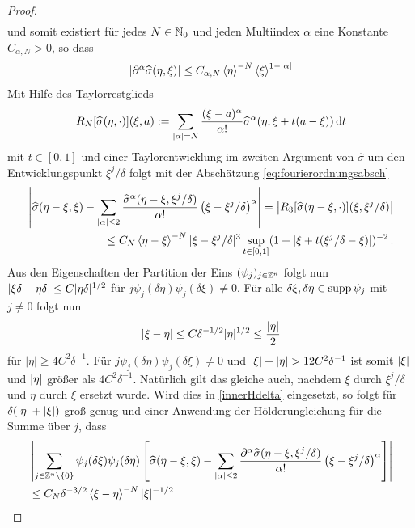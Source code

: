 \begin{proof}
\begin{align}
\end{align}
und somit existiert für jedes $N\in\mathbb N_0$ und jeden Multiindex $\alpha$ eine Konstante $C_{\alpha,N}> 0 $, so dass
\begin{align}\label{eq:fourierordnungsabsch}
\lvert\partial ^\alpha \widehat \sigma(\eta,\xi)\rvert \le C_{\alpha,N}\braket{\eta}^{-N}\braket{\xi}^{1-\lvert\alpha\rvert}
\end{align}
Mit Hilfe des Taylorrestglieds
\begin{align}
R_N[\widehat \sigma(\eta,\cdot)](\xi,a):= \sum_{\lvert\alpha\rvert=N}\frac{(\xi-a)^\alpha}{\alpha!}\widehat \sigma^\alpha(\eta,\xi+t(a-\xi))\,\mathrm d t
\end{align}
mit $t\in[0,1]$ und einer Taylorentwicklung im zweiten Argument von $\widehat \sigma$ um den Entwicklungspunkt $\xi^j/\delta$ folgt mit der Abschätzung \eqref{eq:fourierordnungsabsch}
\begin{align}
\left\lvert\widehat \sigma(\eta-\xi,\xi) - \sum_{\lvert\alpha\rvert \le 2} \frac{\widehat\sigma^\alpha(\eta-\xi,\xi^j/\delta)}{\alpha!}\left( \xi - \xi^j/\delta\right)^\alpha\right\rvert = \left\lvert R_3[\widehat \sigma(\eta-\xi,\cdot)](\xi,\xi^j/\delta)\right\rvert\nonumber\\ \le
C_N\braket{\eta-\xi}^{-N}|\xi-\xi^j/\delta|^3\sup_{t\in[0,1]}(1+|\xi+t(\xi^j/\delta -\xi)|)^{-2}\,.\label{innerHdelta}
\end{align}
Aus den Eigenschaften der Partition der Eins $(\psi_j)_{j\in\mathbb Z^n}$ folgt nun $|\xi\delta-\eta\delta|\le C\lvert\eta\delta\rvert^{1/2}$ für $j\psi_j(\delta\eta)\psi_j(\delta\xi)\neq 0$. Für alle $\delta\xi,\delta\eta\in\operatorname{supp}\psi_j$ mit $j\neq 0$ folgt nun
\begin{align}
|\xi -\eta| \le C \delta^{-1/2}|\eta|^{1/2}\le \frac{\lvert\eta\rvert}{2}
\end{align}
für $|\eta|\ge 4 C^2\delta^{-1}$. Für $j\psi_j(\delta\eta)\psi_j(\delta\xi)\neq 0$ und $\lvert\xi\rvert + \lvert\eta\rvert>12C^2\delta^{-1}$ ist somit $\lvert\xi\rvert$ und $\lvert\eta\rvert$ größer als $4C^2\delta^{-1}$. Natürlich gilt das gleiche auch, nachdem $\xi$ durch $\xi^j/\delta$ und $\eta$ durch $\xi$ ersetzt wurde. Wird dies in \eqref{innerHdelta} eingesetzt, so folgt für $\delta(\lvert\eta\rvert + \lvert\xi\rvert)$ groß genug und einer Anwendung der Hölderungleichung für die Summe über $j$, dass
\begin{align}
&\Abs{\sum_{j\in\Z^n\setminus\{0\}} \psi_j(\delta\xi)\psi_j(\delta \eta)\left[
\widehat \sigma(\eta-\xi,\xi) - \sum_{\abs \alpha \le 2} \frac{\partial ^\alpha\widehat\sigma(\eta-\xi,\xi^j/\delta)}{\alpha!}\left( \xi - \xi^j/\delta\right)^\alpha
\right]}\\&\le C_N\delta^{-3/2}\braket{\xi-\eta}^{-N}\abs\xi^{-1/2}\\

\end{align}
\end{proof}
